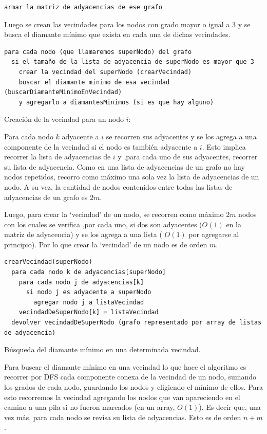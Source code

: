\documentclass[a4paper,11pt] {article}
\begin{document}
\begin{verbatim}
armar la matriz de adyacencias de ese grafo
\end{verbatim}

Luego se crean las vecindades para los nodos con grado mayor o igual a 3 y se busca el diamante mínimo que exista en cada una de dichas vecindades.

\begin{verbatim}
para cada nodo (que llamaremos superNodo) del grafo
  si el tamaño de la lista de adyacencia de superNodo es mayor que 3
    crear la vecindad del superNodo (crearVecindad)
    buscar el diamante minimo de esa vecindad (buscarDiamanteMinimoEnVecindad)
    y agregarlo a diamantesMinimos (si es que hay alguno)
\end{verbatim}

Creación de la vecindad para un nodo $i$:

Para cada nodo $k$ adyacente a $i$ se recorren sus adyacentes y se los agrega a una componente de la vecindad si el nodo es también adyacente a $i$.
Esto implica recorrer la lista de adyacencias de $i$ y ,para cada uno de sus  adyacentes, recorrer su lista de adyacencia. Como en una lista de adyacencias de un grafo no hay nodos repetidos, recorro como máximo una sola vez la lista de adyacencias de un nodo. A su vez, la cantidad de nodos contenidos entre todas las listas de adyacencias de un grafo es $2m$.

Luego, para crear la ‘vecindad’ de un nodo, se recorren como máximo $2m$ nodos con los cuales se verifica ,por cada uno, si dos son adyacentes ($O(1)$ en la matriz de adyacencia) y se los agrega a una lista ( $O(1)$ por agregarse al principio). Por lo que crear la ‘vecindad’ de un nodo es de orden $m$.

\begin{verbatim}
crearVecindad(superNodo)
  para cada nodo k de adyacencias[superNodo]
    para cada nodo j de adyacencias[k]
      si nodo j es adyacente a superNodo
        agregar nodo j a listaVecindad
    vecindadDeSuperNodo[k] = listaVecindad
  devolver vecindadDeSuperNodo (grafo representado por array de listas de adyacencia)
\end{verbatim}

Búsqueda del diamante mínimo en una determinada vecindad.

Para buscar el diamante mínimo en una vecindad lo que hace el algoritmo es recorrer por DFS cada componente conexa de la vecindad de un nodo,  sumando los grados de cada nodo, guardando los nodos y eligiendo el mínimo de ellos.
Para esto recorremos la vecindad agregando los nodos que van apareciendo en el camino a una pila si no fueron marcados (en un array, $O(1)$). Es decir que, una vez más, para cada nodo se revisa su lista de adyacencias. Esto es de orden $n + m$.
\end{document}
